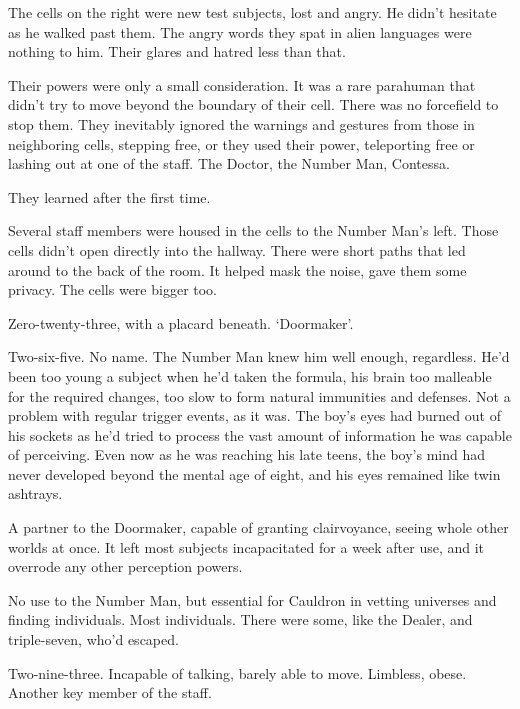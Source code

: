 The cells on the right were new test subjects, lost and angry.  He didn't hesitate as he walked past them.  The angry words they spat in alien languages were nothing to him.  Their glares and hatred less than that.



Their powers were only a small consideration.  It was a rare parahuman that didn't try to move beyond the boundary of their cell.  There was no forcefield to stop them.  They inevitably ignored the warnings and gestures from those in neighboring cells, stepping free, or they used their power, teleporting free or lashing out at one of the staff.  The Doctor, the Number Man, Contessa.



They learned after the first time.



Several staff members were housed in the cells to the Number Man's left.  Those cells didn't open directly into the hallway.  There were short paths that led around to the back of the room.  It helped mask the noise, gave them some privacy.  The cells were bigger too.



Zero-twenty-three, with a placard beneath.  `Doormaker'.



Two-six-five.  No name.  The Number Man knew him well enough, regardless.  He'd been too young a subject when he'd taken the formula, his brain too malleable for the required changes, too slow to form natural immunities and defenses.  Not a problem with regular trigger events, as it was.  The boy's eyes had burned out of his sockets as he'd tried to process the vast amount of information he was capable of perceiving.  Even now as he was reaching his late teens, the boy's mind had never developed beyond the mental age of eight, and his eyes remained like twin ashtrays.



A partner to the Doormaker, capable of granting clairvoyance, seeing whole other worlds at once.  It left most subjects incapacitated for a week after use, and it overrode any other perception powers.



No use to the Number Man, but essential for Cauldron in vetting universes and finding individuals.  Most individuals.  There were some, like the Dealer, and triple-seven, who'd escaped.



Two-nine-three.  Incapable of talking, barely able to move.  Limbless, obese.  Another key member of the staff.



